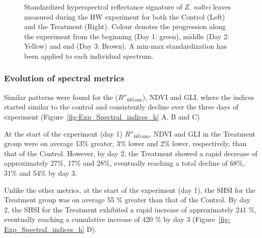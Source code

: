 \documentclass[
  letterpaper,
  11pt,
  english,
  singlespacing,
  headsepline]{MastersDoctoralThesis}
\begin{document}
\begin{spacing}{1.5}
\begin{figure}


\caption{\label{fig-Exp_Spectra_h}Standardized hyperspectral reflectance
signature of \emph{Z. noltei} leaves measured during the HW experiment
for both the Control (Left) and the Treatment (Right). Colour denotes
the progression along the experiment from the beginning (Day 1: green),
middle (Day 2: Yellow) and end (Day 3: Brown). A min-max standardization
has been applied to each individual spectrum.}

\end{figure}%

\subsubsection{Evolution of spectral
metrics}\label{evolution-of-spectral-metrics}

Similar patterns were found for the (\(R''_{665 \, \text{nm}}\)), NDVI
and GLI, where the indices started similar to the control and
consistently decline over the three days of experiment
(Figure~\ref{fig-Exp_Spectral_indices_h} A, B and C)

At the start of the experiment (day 1) \(R''_{665 \, \text{nm}}\), NDVI
and GLI in the Treatment group were on average 13\% greater, 3\% lower
and 2\% lower, respectively, than that of the Control. However, by day
2, the Treatment showed a rapid decrease of approximately 27\%, 17\% and
28\%, eventually reaching a total decline of 68\%, 31\% and 54\% by day
3.

Unlike the other metrics, at the start of the experiment (day 1), the
SHSI for the Treatment group was on average 55 \% greater than that of
the Control. By day 2, the SHSI for the Treatment exhibited a rapid
increase of approximately 241 \%, eventually reaching a cumulative
increase of 420 \% by day 3 (Figure~\ref{fig-Exp_Spectral_indices_h} D).


\end{spacing}
\end{document}
